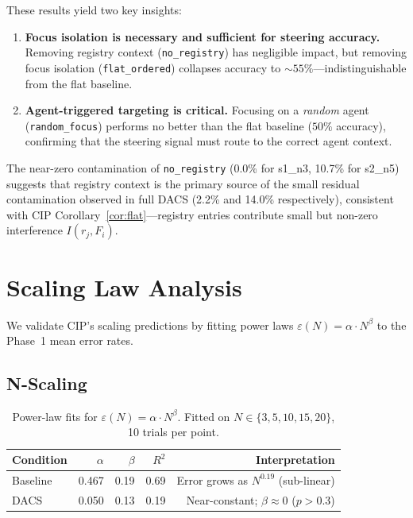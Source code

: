 \documentclass{article}
\begin{document}
These results yield two key insights:
\begin{enumerate}
  \item \textbf{Focus isolation is necessary and sufficient for steering accuracy.}
  Removing registry context (\texttt{no\_registry}) has negligible impact,
  but removing focus isolation (\texttt{flat\_ordered}) collapses accuracy to
  ${\sim}55\%$---indistinguishable from the flat baseline.
  \item \textbf{Agent-triggered targeting is critical.}
  Focusing on a \emph{random} agent (\texttt{random\_focus}) performs no
  better than the flat baseline ($50\%$ accuracy), confirming that the
  steering signal must route to the correct agent context.
\end{enumerate}

The near-zero contamination of \texttt{no\_registry} (0.0\% for s1\_n3,
10.7\% for s2\_n5) suggests that registry context is the primary source
of the small residual contamination observed in full DACS (2.2\% and 14.0\%
respectively), consistent with CIP Corollary~\ref{cor:flat}---registry
entries contribute small but non-zero interference $I(r_j, F_i)$.

\section{Scaling Law Analysis}
\label{sec:scaling}

We validate CIP's scaling predictions by fitting power laws
$\varepsilon(N) = \alpha \cdot N^\beta$ to the Phase~1 mean error rates.

\subsection{N-Scaling}

\begin{table}[t]
\caption{Power-law fits for $\varepsilon(N) = \alpha \cdot N^\beta$.
Fitted on $N \in \{3, 5, 10, 15, 20\}$, 10 trials per point.}
\label{tab:scaling_n}
\centering
\small
\begin{tabular}{lrrrr}
\toprule
Condition & $\alpha$ & $\beta$ & $R^2$ & Interpretation \\
\midrule
Baseline & 0.467 & 0.19 & 0.69 & Error grows as $N^{0.19}$ (sub-linear) \\
DACS     & 0.050 & 0.13 & 0.19 & Near-constant; $\beta \approx 0$ ($p > 0.3$) \\
\bottomrule
\end{tabular}
\end{table}
\end{document}
